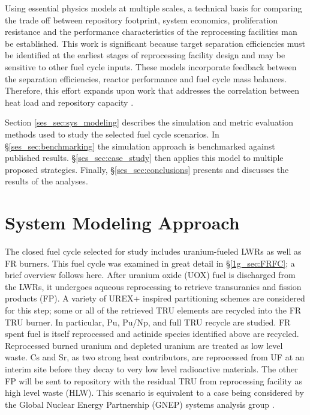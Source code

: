 Using essential physics models at multiple scales,
a technical basis for comparing the trade off between
repository footprint, system economics, proliferation resistance and
the performance characteristics of the reprocessing facilities man be established.  This
work is significant because target separation efficiencies must be
identified at the earliest stages of reprocessing facility design
and may be sensitive to other fuel cycle inputs.  These
models incorporate feedback between the separation efficiencies, reactor
performance and fuel cycle mass balances.  Therefore, this effort
expands upon work that addresses the correlation between heat load
and repository capacity \cite{repmodel}.  

Section \ref{ses_sec:sys_modeling} describes the simulation and metric evaluation
methods used to study the selected fuel cycle scenarios.  In \S \ref{ses_sec:benchmarking}
the simulation approach is benchmarked against published results. \S \ref{ses_sec:case_study}
then applies this model to multiple proposed strategies.
Finally, \S \ref{ses_sec:conclusions} presents and discusses the results of the analyses.


\section{System Modeling Approach}
\label{ses_sec:sys_modeling}
The closed fuel cycle selected for study includes uranium-fueled LWRs
as well as FR burners.  This fuel cycle was examined in great detail in 
\S \ref{1g_sec:FRFC}; a brief overview follows here.  After uranium oxide 
(UOX) fuel is discharged from the LWRs, it undergoes aqueous reprocessing 
to retrieve transuranics and fission products (FP).  A variety of UREX+ inspired
partitioning schemes are considered for this step; some or all of the
retrieved TRU elements are recycled into the FR TRU burner.  In
particular, Pu, Pu/Np, and full TRU recycle are studied.  FR spent fuel
is itself reprocessed and actinide species identified above are
recycled. Reprocessed burned uranium and depleted uranium are treated as
low level waste. Cs and Sr, as two strong heat contributors, are
reprocessed from UF at an interim site before they decay to very low
level radioactive materials. The other FP will be sent to repository
with the residual TRU from reprocessing facility as high level waste
(HLW).  This scenario is equivalent to a case being considered by the
Global Nuclear Energy Partnership (GNEP) systems analysis group \cite{Piet2004}. 


